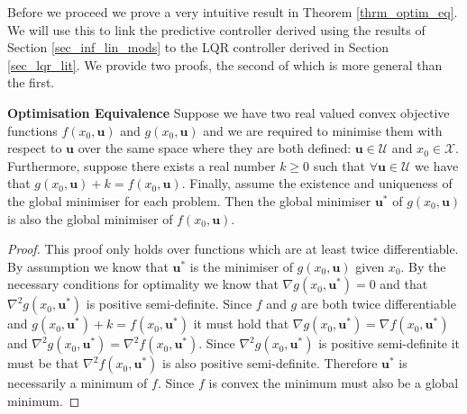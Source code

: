 Before we proceed we prove a very intuitive result in Theorem \ref{thrm_optim_eq}. We will use this to link the predictive controller derived using the results of Section \ref{sec_inf_lin_mods} to the LQR controller derived in Section \ref{sec_lqr_lit}. We provide two proofs, the second of which is more general than the first.
\begin{thrm}
\textbf{Optimisation Equivalence} Suppose we have two real valued convex objective functions $f(x_0,\mathbf{u})$ and $g(x_0, \mathbf{u})$ and we are required to minimise them with respect to $\mathbf{u}$ over the same space where they are both defined: $\mathbf{u}\in \mathcal{U}$ and $x_0 \in \mathcal{X}$. Furthermore, suppose there exists a real number $k \geq 0$ such that $\forall \mathbf{u} \in \mathcal{U}$ we have that $g(x_0, \mathbf{u}) + k = f(x_0, \mathbf{u})$. Finally, assume the existence and uniqueness of the global minimiser for each problem. Then the global minimiser $\mathbf{u}^*$ of $g(x_0, \mathbf{u})$ is also the global minimiser of $f(x_0, \mathbf{u})$.
\label{thrm_optim_eq}
\end{thrm}
\begin{proof}
This proof only holds over functions which are at least twice differentiable. By assumption we know that $\mathbf{u}^*$ is the minimiser of $g(x_0, \mathbf{u})$ given $x_0$. By the necessary conditions for optimality \cite{forst} we know that $\nabla g(x_0, \mathbf{u}^*) = 0$ and that $\nabla ^2 g(x_0, \mathbf{u}^*)$ is positive semi-definite. Since $f$ and $g$ are both twice differentiable and  $g(x_0, \mathbf{u}^*) + k = f(x_0, \mathbf{u}^*)$ it must hold that $\nabla g(x_0, \mathbf{u}^*) = \nabla f(x_0, \mathbf{u}^*)$ and  $\nabla ^2 g(x_0, \mathbf{u}^*) = \nabla ^2 f(x_0, \mathbf{u}^*)$. Since $\nabla ^2 g(x_0, \mathbf{u}^*)$ is positive semi-definite it must be that $\nabla ^2 f(x_0, \mathbf{u}^*)$ is also positive semi-definite. Therefore $\mathbf{u}^*$ is necessarily a minimum of $f$. Since $f$ is convex the minimum must also be a global minimum.
\end{proof}
